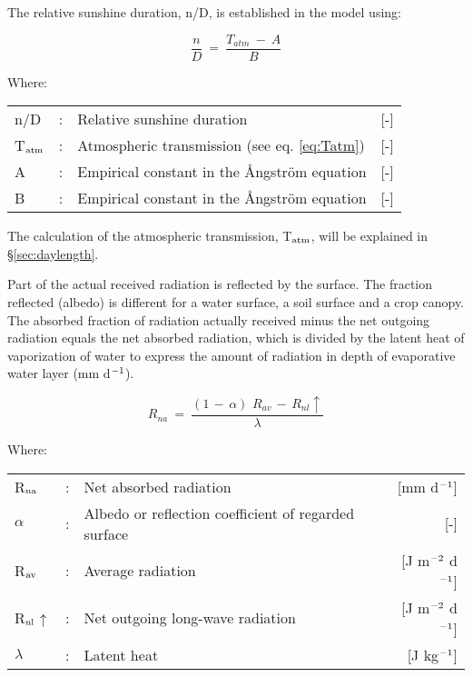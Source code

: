 The relative sunshine duration, n/D, is established in the model using:

\begin{equation}
{\frac{n}{D}} ~=~{\frac{T_{atm} ~-~A}{B}}
\end{equation}

Where:\\[5pt]
\begin{tabularx}{\textwidth}{llXr}
n/D &:& Relative sunshine duration  & [-]\\
T$_{{\rm atm}}$ &:& Atmospheric transmission (see eq. \ref{eq:Tatm})  & [-]\\
A &:& Empirical constant in the \AA ngstr\"{o}m equation  & [-]\\
B &:& Empirical constant in the \AA ngstr\"{o}m equation  & [-]\\
\end{tabularx}


The calculation of the atmospheric transmission, T$_{{\rm atm}}$, will be explained in 
\S \ref{sec:daylength}.

Part of the actual received radiation is reflected by the surface. The fraction reflected
(albedo) is different for a water surface, a soil surface and a crop canopy. The absorbed
fraction of radiation actually received minus the net outgoing radiation equals the net
absorbed radiation, which is divided by the latent heat of vaporization of water to express
the amount of radiation in depth of evaporative water layer (mm d$^{{\rm -1}}$).

\begin{equation}
\label{eq:AbsGlobRad}
R _{na} ~=~{\frac{(1\, -\, \alpha )\,\, R _{av} \, -\, R _{nl} \uparrow  }{\lambda}}
\end{equation}

 
Where:\\[5pt]
\begin{tabularx}{\textwidth}{llXr}
R$_{{\rm na}}$ &:& Net absorbed radiation  & [mm d$^{{\rm -1}}$]\\
$\alpha$ &:& Albedo or reflection coefficient of regarded surface  & [-]\\
R$_{{\rm av}}$ &:& Average radiation  & [J m$^{{\rm -2}}$ d$^{{\rm -1}}$]\\
R$_{{\rm nl}}$$\uparrow$ &:& Net outgoing long-wave radiation  & [J m$^{{\rm -2}}$ d$^{{\rm -1}}$]\\
$\lambda$ &:& Latent heat  & [J kg$^{{\rm -1}}$]\\
\end{tabularx}


